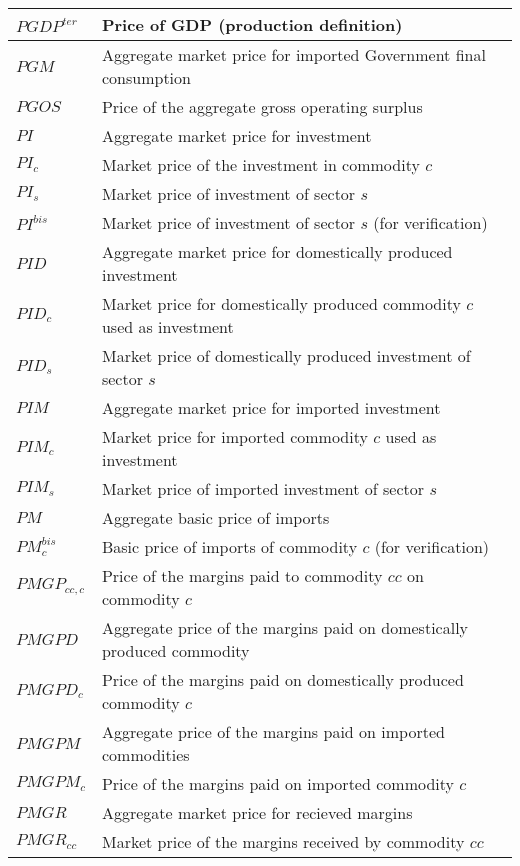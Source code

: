 \documentclass[12pt]{article}
\numberwithin{equation}{section}
\begin{document}
\begin{longtable}{@{}p{4cm}p{9cm}@{}}
 \midrule 
$PGDP^{ter}$ & Price of GDP (production definition) \\
 \midrule 
$PGM$ & Aggregate market price for imported Government final consumption \\
 \midrule 
$PGOS$ & Price of the aggregate gross operating surplus \\
 \midrule 
$PI$ & Aggregate market price for investment \\
 \midrule 
$PI_{c}$ & Market price of the investment in commodity $c$ \\
 \midrule 
$PI_{s}$ & Market price of investment of sector $s$ \\
 \midrule 
$PI^{bis}$ & Market price of investment of sector $s$ (for verification) \\
 \midrule 
$PID$ & Aggregate market price for domestically produced investment \\
 \midrule 
$PID_{c}$ & Market price for domestically produced commodity $c$ used as investment \\
 \midrule 
$PID_{s}$ & Market price of domestically produced investment of sector $s$ \\
 \midrule 
$PIM$ & Aggregate market price for imported investment \\
 \midrule 
$PIM_{c}$ & Market price for imported commodity $c$ used as investment \\
 \midrule 
$PIM_{s}$ & Market price of imported investment of sector $s$ \\
 \midrule 
$PM$ & Aggregate basic price of imports \\
 \midrule 
$PM^{bis}_{c}$ & Basic price of imports of commodity $c$ (for verification) \\
 \midrule 
$PMGP_{cc, c}$ & Price of the margins paid to commodity $cc$ on commodity $c$ \\
 \midrule 
$PMGPD$ & Aggregate price of the margins paid on domestically produced commodity \\
 \midrule 
$PMGPD_{c}$ & Price of the margins paid on domestically produced commodity $c$ \\
 \midrule 
$PMGPM$ & Aggregate price of the margins paid on imported commodities \\
 \midrule 
$PMGPM_{c}$ & Price of the margins paid on imported commodity $c$ \\
 \midrule 
$PMGR$ & Aggregate market price for recieved margins \\
 \midrule 
$PMGR_{cc}$ & Market price of the margins received by commodity $cc$ \\

\end{longtable}
\end{document}

